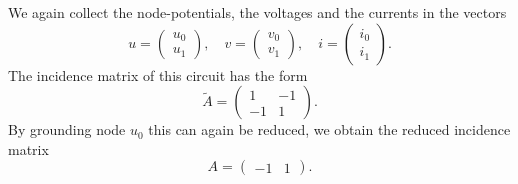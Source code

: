 \begin{example2}[LC-Circuit]
	We again collect the node-potentials, the voltages and the currents in the vectors
	\begin{displaymath}
		u=
		\left(
		\begin{matrix}
			u_0 \\
			u_1
		\end{matrix}
		\right),
		\quad
		v=
		\left(
		\begin{matrix}
			v_0 \\
			v_1
		\end{matrix}
		\right),
		\quad
		i=
		\left(
		\begin{matrix}
			i_0 \\
			i_1
		\end{matrix}
		\right).
	\end{displaymath}
	The incidence matrix of this circuit has the form
	\begin{displaymath}
		\tilde{A} = 
		\left(
		\begin{matrix}
			1 & -1  \\
			-1 & 1 
		\end{matrix}
		\right).
	\end{displaymath}
	By grounding node $u_0$ this can again be reduced, we obtain the reduced incidence matrix
	\begin{displaymath}
		A = 
		\left(
		\begin{matrix}
			-1 & 1  
		\end{matrix}
		\right).
	\end{displaymath}
\end{example2}

